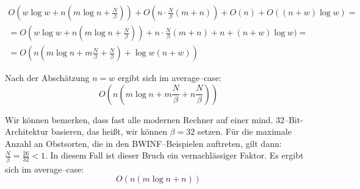 \begin{equation*}
\begin{gathered}
O(w \log w + n (m \log n + \frac{N}{\beta})) + O(n\cdot \frac{N}{\beta}(m + n)) + O(n) + O((n + w)\log w) =\\
= O(w \log w + n (m \log n + \frac{N}{\beta})) + n\cdot \frac{N}{\beta}(m + n) + n + (n + w)\log w) =\\
= O(n(m \log n + m \frac{N}{\beta} + \frac{N}{\beta}) + \log w(n+w))
\end{gathered}
\end{equation*}

Nach der Abschätzung $n = w$ ergibt sich im average--case:
\[
O(n(m \log n + m \frac{N}{\beta} + n \frac{N}{\beta}))
\]

Wir können bemerken, dass fast alle modernen Rechner auf einer
mind. 32--Bit-Architektur basieren, das heißt, wir können $\beta = 32$ setzen.
Für die maximale Anzahl an Obstsorten, die in den BWINF--Beispielen auftreten, gilt
dann: $\frac{N}{\beta} = \frac{26}{32} < 1$.
In diesem Fall ist dieser Bruch ein vernachlässiger Faktor. Es ergibt sich im average--case:
\[
O(n(m \log n + n))
\]


